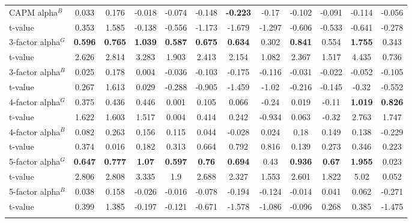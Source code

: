\documentclass[11pt]{article}
\begin{document}
\begin{appendices}
\begin{table}[!htbp]
{\begin{tabular}{@{\extracolsep{5pt}} lccccccccccc}
			CAPM alpha$^B$ & 0.033 & 0.176 & -0.018 & -0.074 & -0.148 & \textbf{-0.223} & -0.17 & -0.102 & -0.091 & -0.114 & -0.056 \\ 			
			t-value & 0.353 & 1.585 & -0.138 & -0.556 & -1.173 & -1.679 & -1.297 & -0.606 & -0.533 & -0.641 & -0.278 \\[4ex] 
			
			3-factor alpha$^G$ & \textbf{0.596} & \textbf{0.765} & \textbf{1.039} & \textbf{0.587} & \textbf{0.675} & \textbf{0.634} & 0.302 & \textbf{0.841} & 0.554 & \textbf{1.755} & 0.343 \\ 
			t-value & 2.626 & 2.814 & 3.283 & 1.903 & 2.413 & 2.154 & 1.082 & 2.367 & 1.517 & 4.435 & 0.736 \\[2ex] 
			
			3-factor alpha$^B$ & 0.025 & 0.178 & 0.004 & -0.036 & -0.103 & -0.175 & -0.116 & -0.031 & -0.022 & -0.052 & -0.105 \\ 			
			t-value & 0.267 & 1.613 & 0.029 & -0.288 & -0.905 & -1.459 & -1.02 & -0.216 & -0.145 & -0.32 & -0.552 \\[4ex] 
			
			4-factor alpha$^G$ & 0.375 & 0.436 & 0.446 & 0.001 & 0.105 & 0.066 & -0.24 & 0.019 & -0.11 & \textbf{1.019} & \textbf{0.826} \\ 
			t-value & 1.622 & 1.603 & 1.517 & 0.004 & 0.414 & 0.242 & -0.934 & 0.063 & -0.32 & 2.763 & 1.747 \\[2ex] 
			
			4-factor alpha$^B$ & 0.082 & 0.263 & 0.156 & 0.115 & 0.044 & -0.028 & 0.024 & 0.18 & 0.149 & 0.138 & -0.229 \\ 
			t-value & 0.374 & 0.016 & 0.182 & 0.313 & 0.664 & 0.792 & 0.816 & 0.139 & 0.273 & 0.346 & 0.223 \\[4ex] 
			
			5-factor alpha$^G$ & \textbf{0.647} & \textbf{0.777} & \textbf{1.07} & \textbf{0.597} & \textbf{0.76} & \textbf{0.694} & 0.43 & \textbf{0.936} & \textbf{0.67} & \textbf{1.955} & 0.023 \\ 
			t-value & 2.806 & 2.808 & 3.335 & 1.9 & 2.688 & 2.327 & 1.553 & 2.601 & 1.822 & 5.02 & 0.052 \\[2ex] 
			
			5-factor alpha$^B$ & 0.038 & 0.158 & -0.026 & -0.016 & -0.078 & -0.194 & -0.124 & -0.014 & 0.041 & 0.062 & -0.271 \\ 
			t-value & 0.399 & 1.385 & -0.197 & -0.121 & -0.671 & -1.578 & -1.086 & -0.096 & 0.268 & 0.385 & -1.475 \\ 
			\hline \\[-1.8ex] 
	\end{tabular}}
\end{table} 







\end{appendices}
\end{document}
